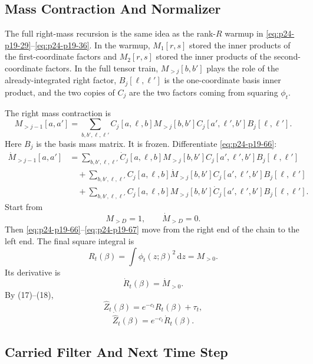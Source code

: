 \documentclass[11pt]{article}
\newcommand{\dd}{\,\mathrm d}
\begin{document}
\subsection{Mass Contraction And Normalizer}

The full right-mass recursion is the same idea as the rank-\(R\) warmup in
\eqref{eq:p24-p19-29}--\eqref{eq:p24-p19-36}.  In the warmup, \(M_1[r,s]\) stored the inner products of the
first-coordinate factors and \(M_2[r,s]\) stored the inner products of the
second-coordinate factors.  In the full tensor train, \(M_{>j}[b,b']\) plays
the role of the already-integrated right factor, \(B_j[\ell,\ell']\) is the
one-coordinate basis inner product, and the two copies of \(C_j\) are the two
factors coming from squaring \(\phi_t\).

The right mass contraction is
\[
    M_{>j-1}[a,a']
    =
    \sum_{b,b',\ell,\ell'}
    C_j[a,\ell,b]
    M_{>j}[b,b']
    C_j[a',\ell',b']
    B_j[\ell,\ell'].
    \label{eq:p24-p19-66}
\]
Here \(B_j\) is the basis mass matrix.  It is frozen.  Differentiate \eqref{eq:p24-p19-66}:
\[
\begin{aligned}
    \dot M_{>j-1}[a,a']
    &=
    \sum_{b,b',\ell,\ell'}
    \dot C_j[a,\ell,b]
    M_{>j}[b,b']
    C_j[a',\ell',b']
    B_j[\ell,\ell']\\
    &\quad+
    \sum_{b,b',\ell,\ell'}
    C_j[a,\ell,b]
    \dot M_{>j}[b,b']
    C_j[a',\ell',b']
    B_j[\ell,\ell']\\
    &\quad+
    \sum_{b,b',\ell,\ell'}
    C_j[a,\ell,b]
    M_{>j}[b,b']
    \dot C_j[a',\ell',b']
    B_j[\ell,\ell'].
\end{aligned}
\label{eq:p24-p19-67}
\]
Start from
\[
    M_{>D}=1,
    \qquad
    \dot M_{>D}=0.
    \label{eq:p24-p19-68}
\]
Then \eqref{eq:p24-p19-66}--\eqref{eq:p24-p19-67} move from the right end of the chain to the left end.  The
final square integral is
\[
    R_t(\beta)=\int\phi_t(z;\beta)^2\dd z=M_{>0}.
    \label{eq:p24-p19-69}
\]
Its derivative is
\[
    \dot R_t(\beta)=\dot M_{>0}.
    \label{eq:p24-p19-70}
\]
By (17)--(18),
\[
    \widehat Z_t(\beta)=e^{-c_t}R_t(\beta)+\tau_t,
    \label{eq:p24-p19-71}
\]
\[
    \dot{\widehat Z}_t(\beta)=e^{-c_t}\dot R_t(\beta).
    \label{eq:p24-p19-72}
\]

\subsection{Carried Filter And Next Time Step}
\end{document}
